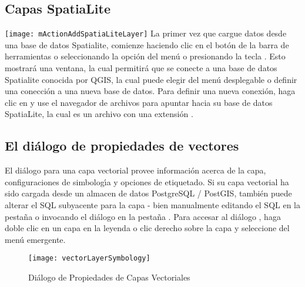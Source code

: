 \subsection{Capas SpatiaLite} 
\label{label_spatialite} 

\texttt{[image: mActionAddSpatiaLiteLayer]}
La primer vez que cargue datos desde una base de datos Spatialite, comienze haciendo clic en el bot\'on de la barra
de herramientas  o seleccionando la opci\'on  
del men\'u  o presionando la tecla . 
Esto mostrar\'a una ventana, la cual permitir\'a que se conecte a una base de datos Spatialite conocida por QGIS, la cual 
puede elegir del men\'u desplegable o definir una conecci\'on a una nueva base de datos. Para definir una nueva conexi\'on, haga clic en  y use el navegador de archivos para apuntar hacia su base de datos SpatiaLite, 
la cual es un archivo con una extensi\'on .

\subsection{El di\'alogo de propiedades de vectores}\label{sec:vectorprops}

El di\'alogo  para una capa vectorial 
provee informaci\'on acerca de la capa, configuraciones
de simbolog\'{\i}a y opciones de etiquetado. Si su capa vectorial ha sido cargada desde
un almacen de datos PostgreSQL / PostGIS, también puede alterar el SQL subyacente para la
capa - bien manualmente editando el SQL en la pesta\~na  o invocando
el di\'alogo  en la pesta\~na . 
Para accesar al di\'alogo
, haga doble clic en un capa en la leyenda o clic derecho sobre
la capa y seleccione  del men\'u emergente.

\begin{figure}[H]
   \begin{center}
   \caption{Di\'alogo de Propiedades de Capas Vectoriales \nixcaption}\label{fig:vector_symbology}\smallskip
   \texttt{[image: vectorLayerSymbology]} 
\end{center}  
\end{figure}

